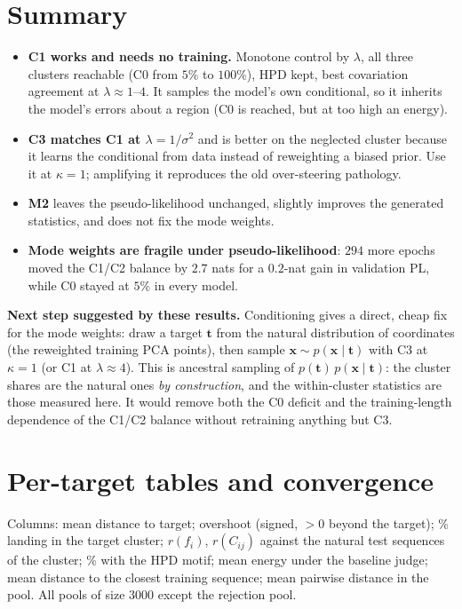 \section{Summary}\label{sec:sum}
\begin{itemize}[leftmargin=*,itemsep=2pt]
\item \textbf{C1 works and needs no training.} Monotone control by $\lambda$, all three clusters
      reachable (C0 from $5\%$ to $100\%$), HPD kept, best covariation agreement at
      $\lambda\approx1$--$4$. It samples the model's own conditional, so it inherits the model's
      errors about a region (C0 is reached, but at too high an energy).
\item \textbf{C3 matches C1 at $\lambda=1/\sigma^2$} and is better on the neglected cluster because
      it learns the conditional from data instead of reweighting a biased prior. Use it at $\kappa=1$;
      amplifying it reproduces the old over-steering pathology.
\item \textbf{M2} leaves the pseudo-likelihood unchanged, slightly improves the generated
      statistics, and does not fix the mode weights.
\item \textbf{Mode weights are fragile under pseudo-likelihood}: $294$ more epochs moved the C1/C2
      balance by $2.7$ nats for a $0.2$-nat gain in validation PL, while C0 stayed at $5\%$ in every
      model.
\end{itemize}

\noindent\textbf{Next step suggested by these results.} Conditioning gives a direct, cheap fix for
the mode weights: draw a target $\bm t$ from the natural distribution of coordinates (the reweighted
training PCA points), then sample $\bm x\sim p(\bm x\mid\bm t)$ with C3 at $\kappa=1$ (or C1 at
$\lambda\approx4$). This is ancestral sampling of $p(\bm t)\,p(\bm x\mid\bm t)$: the cluster shares
are the natural ones \emph{by construction}, and the within-cluster statistics are those measured
here. It would remove both the C0 deficit and the training-length dependence of the C1/C2 balance
without retraining anything but C3.

\appendix
\section{Per-target tables and convergence}
\noindent Columns: mean distance to target; overshoot (signed, $>0$ beyond the target); \% landing in
the target cluster; $r(f_i)$, $r(C_{ij})$ against the natural test sequences of the cluster; \% with
the HPD motif; mean energy under the baseline judge; mean distance to the closest training
sequence; mean pairwise distance in the pool. All pools of size $3000$ except the rejection pool.

